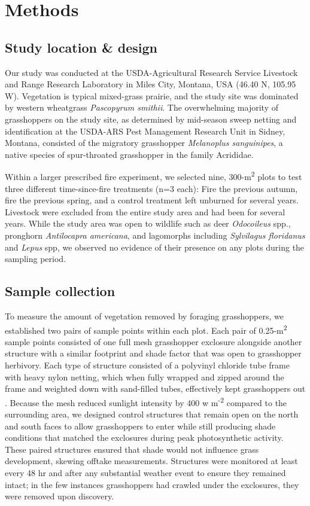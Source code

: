 \documentclass[referee, 
	            sn-basic]
           {sn-jnl}
\begin{document}
\section{Methods}

\subsection{Study location \& design} 

Our study was conducted at the USDA-Agricultural Research Service Livestock and Range Research Laboratory in Miles City, Montana, USA (46.40 N, 105.95 W).  
Vegetation is typical mixed-grass prairie, and the study site was dominated by western wheatgrass \emph{Pascopyrum smithii}.  
The overwhelming majority of grasshoppers on the study site, as determined by mid-season sweep netting and identification at the USDA-ARS Pest Management Research Unit in Sidney, Montana, consisted of the migratory grasshopper \emph{Melanoplus sanguinipes}, a native species of spur-throated grasshopper in the family Acrididae. 

Within a larger prescribed fire experiment, we selected nine, 300-m\textsuperscript{2} plots to test three different time-since-fire treatments (n=3 each): Fire the previous autumn, fire the previous spring, and a control treatment left unburned for several years. 
Livestock were excluded from the entire study area and had been for several years.
While the study area was open to wildlife such as deer \emph{Odocoileus} spp., pronghorn \emph{Antilocapra americana}, and lagomorphs including \emph{Sylvilagus floridanus} and \emph{Lepus} spp, we observed no evidence of their presence on any plots during the sampling period. 

\subsection{Sample collection}

To measure the amount of vegetation removed by foraging grasshoppers, we established two pairs of sample points within each plot. 
Each pair of 0.25-m\textsuperscript{2} sample points consisted of one full mesh grasshopper exclosure alongside another structure with a similar footprint and shade factor that was open to grasshopper herbivory.
Each type of structure consisted of a polyvinyl chloride tube frame with heavy nylon netting, which when fully wrapped and zipped around the frame and weighted down with sand-filled tubes, effectively kept grasshoppers out \citep{parker1985}. 
Because the mesh reduced sunlight intensity by 400 w m\textsuperscript{-2} compared to the
surrounding area, we designed control structures that remain open on the north and south faces to allow grasshoppers to enter while still producing shade conditions that matched the exclosures during peak photosynthetic activity. 
These paired structures ensured that shade would not influence grass development, skewing offtake measurements. 
Structures were monitored at least every 48 hr and after any substantial weather event to ensure they remained intact; in the few instances grasshoppers had crawled under the exclosures, they were removed upon discovery. 
\end{document}

